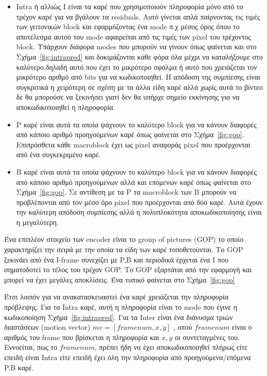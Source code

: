\begin{itemize}
  \item Intra ή αλλιώς I είναι τα καρέ που χρησιμοποιούν πληροφορία μόνο από το τρέχον καρέ για να βγάλουν τα residuals. Αυτό γίνεται απλά παίρνοντας τις τιμές των γειτονικών block και εφαρμόζοντας ένα mode π.χ μέσος όρος όπου το αποτέλεσμα αυτού του mode αφαιρείται από τις τιμές των pixel του τρέχοντος block. Υπάρχουν διάφορα modes που μπορούν να γίνουν όπως φαίνεται και στο Σχήμα~\ref{fig:intrapred} και δοκιμάζονται κάθε φόρα όλα μέχρι να καταλήξουμε στο καλύτερο,δηλαδή αυτό που έχει το μικρότερο σφάλμα ή αυτό που χρειάζεται τον μικρότερο αριθμό από bits για να κωδικοποιηθεί. Η απόδοση της συμπίεσης είναι συγκριτικά η χειρότερη σε σχέση με τα άλλα είδη καρέ αλλά χωρίς αυτά το βίντεο δε θα μπορούσε να ξεκινήσει γιατί δεν θα υπήρχε σημείο εκκίνησης για να αποκωδικοποιηθεί η πληροφορία.

  \item P καρέ είναι αυτά τα οποία ψάχνουν το καλύτερο block για να κάνουν διαφορές από κάποιο αριθμό προηγούμενων καρέ όπως φαίνεται στο Σχήμα~\ref{fig:gop}. Επιπρόσθετα κάθε macroblock έχει ως pixel αναφοράς pixel που προέρχονται από ένα συγκεκριμένο καρέ.

  \item Β καρέ είναι αυτά τα οποία ψάχνουν το καλύτερο block για να κάνουν διαφορές από κάποιο αριθμό προηγούμενων αλλά και επόμενων καρέ όπως φαίνεται στο Σχήμα~\ref{fig:gop}. Σε αντίθεση με τα P τα macroblock των B μπορούν να προβλέπονται από τον μέσο όρο pixel που προέρχονται από δύο καρέ. Αυτά έχουν την καλύτερη απόδοση συμπίεσης αλλά η πολυπλοκότητα αποκωδικοποίησης είναι η μεγαλύτερη.
\end{itemize}

\indent Ένα επιπλέον στοιχείο των encoder είναι το group of pictures (GOP) το οποίο χαρακτηρίζει την σειρά με την οποία τα είδη των καρέ τοποθετούνται. Το GOP ξεκινάει από ένα I-frame συνεχίζει με P,B και περιοδικά έρχεται ένα I που σηματοδοτεί το τέλος του τρέχον GOP. Το GOP εξαρτάται από την εφαρμογή και μπορεί να έχει μεγάλες αποκλίσεις. Ένα τυπικό φαίνεται στο Σχήμα~\ref{fig:gop}

\indent Έτσι λοιπόν για να ανακατασκευαστεί ένα καρέ χρειάζεται την πληροφορία πρόβλεψης. Για τα Intra καρέ, αυτή η πληροφορία είναι το mode που έγινε η κωδικοποίηση Σχήμα~\ref{fig:intrapred}. Για τα Inter είναι ένα διάνυσμα τριών διαστάσεων (motion vector) $mv = [ framenum , x , y]$ ,  οπού $framenum$ είναι ο αριθμός του frame που βρίσκεται η πληροφορία και $x,y$ οι συντεταγμένες του. Εννοείται, πως το $framenum$, πρέπει ήδη να έχει αποκωδικοποιηθεί πλήρως είτε επειδή είναι Intra είτε επειδή έχει όλη την πληροφορία από προηγούμενα/επόμενα P,B καρέ.

